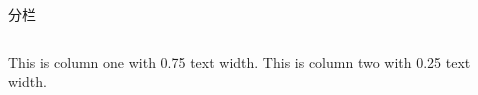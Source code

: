 \documentclass{ctexbeamer}
\begin{document}
\begin{frame}{分栏}
  \begin{columns}
    \centering
    This is column one with 0.75 text width.
    \centering
    This is column two with 0.25 text width.
  \end{columns}
\end{frame}
\end{document}

